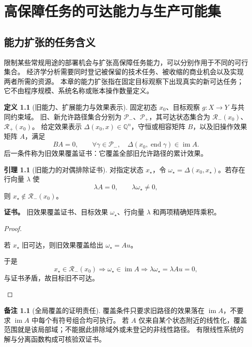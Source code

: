 \documentclass[UTF8,12pt,a4paper,openany,fontset=none,zihao=false]{ctexrep}
\theoremstyle{definition}
\newtheorem{definition}{定义}[chapter]
\newtheorem{lemma}{引理}[chapter]
\newtheorem{remark}{备注}[chapter]
\newenvironment{certificate}{\par\noindent\textbf{证书。}\ignorespaces}{\par}
\DeclareMathOperator{\im}{im}
\newcommand{\QQ}{\mathbb Q}
\newcommand{\1}{\mathbf 1}
\begin{document}
\chapter{高保障任务的可达能力与生产可能集}
\label{front:chapter}

\section{能力扩张的任务含义}

限制某些常规用途的部署机会与扩张高保障任务能力，可以分别作用于不同的可行集合。
经济学分析需要同时登记被保留的技术任务、被收缩的商业机会以及实现两者所需的资源。
本章的能力扩张指在固定目标观察下出现真实的新可达任务；它不由程序规模、系统名称或账本操作数量定义。

\begin{definition}[旧能力、扩展能力与效果表示]
固定初态 \(x_0\)、目标观察 \(g:X\to Y\) 与共同约束域。
旧、新允许路径集合分别为 \(\mathcal P_-\)、\(\mathcal P_+\)，其可达状态集合为
\(\mathcal R_-(x_0)\)、\(\mathcal R_+(x_0)\)。
给定效果表示 \(\Delta(x_0,x)\in\QQ^n\)，守恒或相容矩阵 \(B\)，以及旧操作效果矩阵 \(A\)，满足
\[
BA=0,
\qquad
\forall\gamma\in\mathcal P_-,\quad
\Delta(x_0,\operatorname{end}\gamma)\in\im A.
\]
后一条件称为旧效果覆盖证书：它覆盖全部旧允许路径的累计效果。
\end{definition}

\begin{lemma}[旧能力的对偶排除证书]
\label{front:separation}
对指定状态 \(x_\star\)，令 \(\omega_\star=\Delta(x_0,x_\star)\)。若存在行向量 \(\lambda\) 使
\[
\lambda A=0,\qquad\lambda\omega_\star\ne0,
\]
则 \(x_\star\notin\mathcal R_-(x_0)\)。
\end{lemma}
\begin{certificate}
旧效果覆盖证书、目标效果 \(\omega_\star\)、行向量 \(\lambda\) 和两项精确矩阵乘积。
\end{certificate}
\begin{proof}
\begin{semanticsteps}
\item 若 \(x_\star\) 旧可达，则旧效果覆盖给出 \(\omega_\star=Au\)。
\item 于是
\[
x_\star\in\mathcal R_-(x_0)
\Longrightarrow\omega_\star\in\im A
\Longrightarrow\lambda\omega_\star=\lambda Au=0,
\]
与证书矛盾，故目标旧不可达。
\end{semanticsteps}
\end{proof}

\begin{remark}[全局覆盖的证明责任]
覆盖条件只要求旧路径的效果落在 \(\im A\)，不要求 \(\im A\) 中每个有符号组合均可执行。
若 \(A\) 仅来自某个状态附近的线性化，覆盖范围就是该局部域；不能据此排除域外或未登记的非线性路径。
有限线性系统的解与分离函数构成可核验双证书\cite{InternalEconomics}。
\end{remark}
\end{document}
